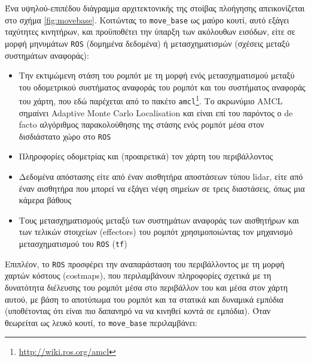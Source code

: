 Ένα υψηλού-επιπέδου διάγραμμα αρχιτεκτονικής της στοίβας πλοήγησης
απεικονίζεται στο σχήμα \ref{fig:movebase}. Κοιτώντας το \texttt{move\_base} ως
μαύρο κουτί, αυτό εξάγει ταχύτητες κινητήρων, και προϋποθέτει την ύπαρξη των
ακόλουθων εισόδων, είτε σε μορφή μηνυμάτων \texttt{ROS} (δομημένα δεδομένα) ή
μετασχηματισμών (σχέσεις μεταξύ συστημάτων αναφοράς):

\begin{itemize}
  \item Την εκτιμώμενη στάση του ρομπότ με τη μορφή ενός μετασχηματισμού μεταξύ
        του οδομετρικού συστήματος αναφοράς του ρομπότ και του συστήματος
        αναφοράς του χάρτη, που εδώ παρέχεται από το πακέτο
        \texttt{amcl}\footnote{\url{http://wiki.ros.org/amcl}}. Το ακρωνύμιο
        AMCL σημαίνει Adaptive Monte Carlo Localisation
        \cite{Fox2001,Grisetti2007} και είναι επί του παρόντος ο de facto
        αλγόριθμος παρακολούθησης της στάσης ενός ρομπότ μέσα στον δισδιάστατο
        χώρο στο \texttt{ROS}
  \item Πληροφορίες οδομετρίας και (προαιρετικά) τον χάρτη του περιβάλλοντος
  \item Δεδομένα απόστασης είτε από έναν αισθητήρα αποστάσεων τύπου lidar, είτε
        από έναν αισθητήρα που μπορεί να εξάγει νέφη σημείων σε τρεις
        διαστάσεις, όπως μια κάμερα βάθους
  \item Τους μετασχηματισμούς μεταξύ των συστημάτων αναφοράς
        των αισθητήρων και των τελικών στοιχείων (effectors) του ρομπότ
        χρησιμοποιώντας τον μηχανισμό μετασχηματισμού του \texttt{ROS}
        (\texttt{tf})
\end{itemize}

Επιπλέον, το \texttt{ROS} προσφέρει την αναπαράσταση του περιβάλλοντος με τη
μορφή χαρτών κόστους (costmaps), που περιλαμβάνουν πληροφορίες σχετικά με τη
δυνατότητα διέλευσης του ρομπότ μέσα στο περιβάλλον του και μέσα στον χάρτη
αυτού, με βάση το αποτύπωμα του ρομπότ και τα στατικά και δυναμικά εμπόδια
(υποθέτοντας ότι είναι πιο δαπανηρό να να κινηθεί κοντά σε εμπόδια). Όταν
θεωρείται ως λευκό κουτί, το \texttt{move\_base} περιλαμβάνει:

